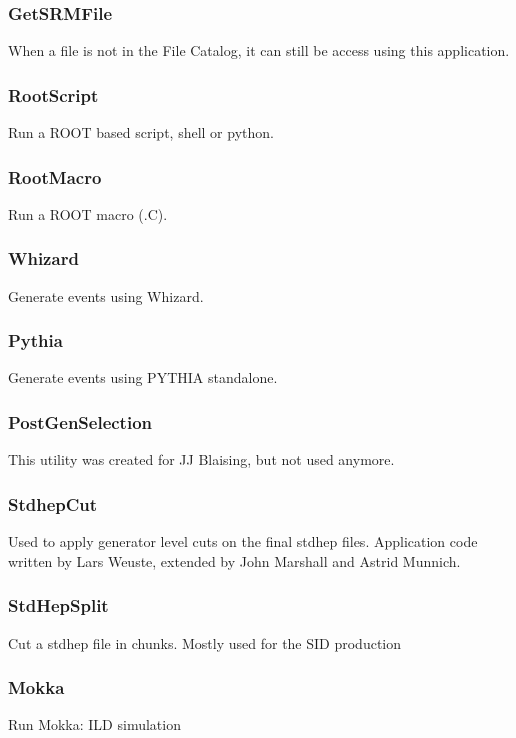 \documentclass[a4paper,12pt]{article}
\begin{document}
\subsubsection{GetSRMFile}\label{getsrmfile}
When a file is not in the File Catalog, it can still be access using this
application.

\subsubsection{RootScript}\label{rootscript}
Run a ROOT based script, shell or python.

\subsubsection{RootMacro}\label{rootmacro}
Run a ROOT macro (.C).

\subsubsection{Whizard}\label{whizard}
Generate events using Whizard.

\subsubsection{Pythia}\label{pythia}
Generate events using PYTHIA standalone.

\subsubsection{PostGenSelection}\label{postgensel}
This utility was created for JJ Blaising, but not used anymore.

\subsubsection{StdhepCut}\label{stdhepcut}
Used to apply generator level cuts on the final stdhep files. Application code
written by Lars Weuste, extended by John Marshall and Astrid Munnich. 

\subsubsection{StdHepSplit}\label{stdhepsplit}
Cut a stdhep file in chunks. Mostly used for the SID production

\subsubsection{Mokka}\label{mokka}
Run Mokka: ILD simulation
\end{document}
